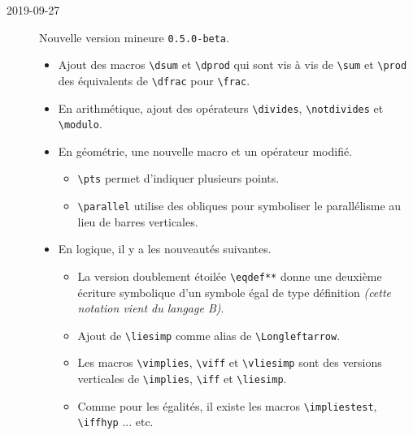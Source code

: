 \documentclass[12pt,a4paper]{article}
\newcommand\env[1]{\texttt{#1}}
\newcommand\macro[1]{\env{\textbackslash{}#1}}
\theoremstyle{definition}
\begin{document}
\begin{description}
    \medskip
    \item[2019-09-27] Nouvelle version mineure \verb+0.5.0-beta+.
    
    \begin{itemize}[itemsep=.5em]
        \item Ajout des macros \macro{dsum} et \macro{dprod} qui sont vis à vis de \macro{sum} et \macro{prod} des équivalents de \macro{dfrac} pour \macro{frac}.
    
    
        \item En arithmétique, ajout des opérateurs \macro{divides}, \macro{notdivides} et \macro{modulo}.
    
    
        \item En géométrie, une nouvelle macro et un opérateur modifié.
        \begin{itemize}[itemsep=.5em]
            \item \macro{pts} permet d'indiquer plusieurs points.
    
            \item \macro{parallel} utilise des obliques pour symboliser le parallélisme au lieu de barres verticales.
        \end{itemize}
    
    
        \item En logique, il y a les nouveautés suivantes.
        \begin{itemize}[itemsep=.5em]
            \item La version doublement étoilée \macro{eqdef**} donne une deuxième écriture symbolique d'un symbole égal de type définition \emph{(cette notation vient du langage B)}.
    
            \item Ajout de \macro{liesimp} comme alias de \macro{Longleftarrow}.
    
            \item Les macros \macro{vimplies}, \macro{viff} et \macro{vliesimp} sont des versions verticales de \macro{implies}, \macro{iff} et \macro{liesimp}.
    
            \item Comme pour les égalités, il existe les macros \macro{impliestest}, \macro{iffhyp} ... etc.
        \end{itemize}
    \end{itemize}


\end{description}
\end{document}
